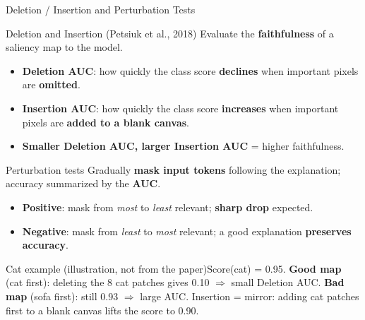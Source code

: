 \documentclass[10pt]{beamer}
\newcommand{\catex}[1]{\begin{exampleblock}{\footnotesize Cat example (illustration, not from the paper)}\footnotesize #1\end{exampleblock}}
\begin{document}
\begin{frame}{Deletion / Insertion and Perturbation Tests}
\footnotesize
\begin{block}{Deletion and Insertion (Petsiuk et al., 2018)}
Evaluate the \textbf{faithfulness} of a saliency map to the model.
\begin{itemize}\footnotesize
\item \textbf{Deletion AUC}: how quickly the class score \textbf{declines} when important pixels are \textbf{omitted}.
\item \textbf{Insertion AUC}: how quickly the class score \textbf{increases} when important pixels are \textbf{added to a blank canvas}.
\item \textbf{Smaller Deletion AUC, larger Insertion AUC} = higher faithfulness.
\end{itemize}
\end{block}
\begin{block}{Perturbation tests}
Gradually \textbf{mask input tokens} following the explanation; accuracy summarized by the \textbf{AUC}.
\begin{itemize}\footnotesize
\item \textbf{Positive}: mask from \emph{most} to \emph{least} relevant; \textbf{sharp drop} expected.
\item \textbf{Negative}: mask from \emph{least} to \emph{most} relevant; a good explanation \textbf{preserves accuracy}.
\end{itemize}
\end{block}
\catex{Score(cat) = 0.95. \textbf{Good map} (cat first): deleting the 8 cat patches gives 0.10 $\Rightarrow$ small Deletion AUC. \textbf{Bad map} (sofa first): still 0.93 $\Rightarrow$ large AUC. Insertion = mirror: adding cat patches first to a blank canvas lifts the score to 0.90.}
\end{frame}
\end{document}

